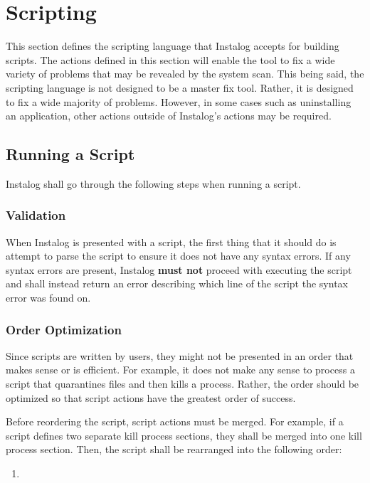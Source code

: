 \section{Scripting}
This section defines the scripting language that Instalog accepts for building
scripts.  The actions defined in this section will enable the tool to fix a wide
variety of problems that may be revealed by the system scan.  This being said,
the scripting language is not designed to be a master fix tool.  Rather, it is
designed to fix a wide majority of problems.  However, in some cases such as
uninstalling an application, other actions outside of Instalog's actions may be
required. 

\subsection{Running a Script}
Instalog shall go through the following steps when running a script.  
\subsubsection{Validation}
When Instalog is presented with a script, the first thing that it should do is
attempt to parse the script to ensure it does not have any syntax errors.  If
any syntax errors are present, Instalog \textbf{must not} proceed with executing
the script and shall instead return an error describing which line of the script
the syntax error was found on.
\subsubsection{Order Optimization}
Since scripts are written by users, they might not be presented in an order that
makes sense or is efficient.  For example, it does not make any sense to process
a script that quarantines files and then kills a process.  Rather, the order
should be optimized so that script actions have the greatest order of success.

Before reordering the script, script actions must be merged.  For example, if a
script defines two separate kill process sections, they shall be merged into one
kill process section.  Then, the script shall be rearranged into the following
order:
\begin{enumerate}
  \item 
\end{enumerate}
